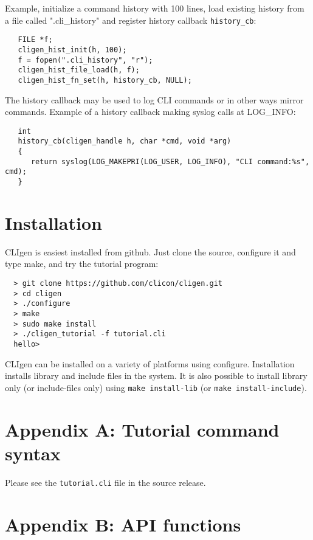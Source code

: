 \documentclass[a4paper, 10pt] {article}
\begin{document}
Example, initialize a command history with 100 lines, load existing history from a file called ".cli\_history" and register history callback {\tt history\_cb}:

\begin{verbatim}
   FILE *f;
   cligen_hist_init(h, 100);
   f = fopen(".cli_history", "r");
   cligen_hist_file_load(h, f);
   cligen_hist_fn_set(h, history_cb, NULL);
\end{verbatim}

The history callback may be used to log CLI commands or in other ways mirror commands. Example of a history callback making syslog calls at LOG\_INFO:

\begin{verbatim}
   int
   history_cb(cligen_handle h, char *cmd, void *arg)
   {
      return syslog(LOG_MAKEPRI(LOG_USER, LOG_INFO), "CLI command:%s", cmd);
   }
\end{verbatim}

\section{Installation}

CLIgen is easiest installed from github. Just clone the source,
configure it and type make, and try the tutorial program:

\begin{verbatim}
  > git clone https://github.com/clicon/cligen.git
  > cd cligen
  > ./configure
  > make
  > sudo make install
  > ./cligen_tutorial -f tutorial.cli
  hello>
\end{verbatim}

CLIgen can be installed on a variety of platforms using
configure. Installation installs library and include files in the
system. It is also possible to install library only (or include-files
only) using {\tt make install-lib} (or {\tt make install-include}).

\normalsize

\newpage
\section*{Appendix A: Tutorial command syntax}
\label{app:syntax}

Please see the {\tt tutorial.cli} file in the source release.


\newpage
\section*{Appendix B: API functions}
\label{app:functions}
\end{document}
